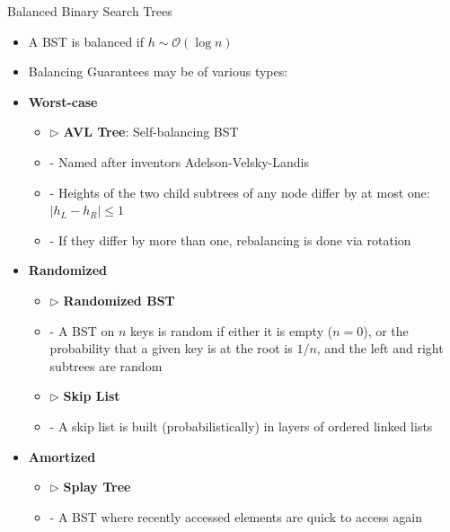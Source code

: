\documentclass[aspectratio=169, xcolor=dvipsnames]{beamer}
\begin{document}
\begin{frame}{Balanced Binary Search Trees}
    \begin{itemize}[<+->]
        \item A BST is balanced if $h \sim \mathcal{O}(\log n)$
        \item Balancing Guarantees may be of various types:
        \item \textbf{Worst-case}
        \begin{itemize}[<+->]
            \item $\triangleright$ \textbf{AVL Tree}: Self-balancing BST
            \item - Named after inventors Adelson-Velsky-Landis
            \item - Heights of the two child subtrees of any node differ by at most one: $| h_L - h_R | \le 1$
            \item - If they differ by more than one, rebalancing is done via rotation
        \end{itemize}
        \item \textbf{Randomized}
        \begin{itemize}[<+->]
            \item $\triangleright$ \textbf{Randomized BST}
            \item - A BST on $n$ keys is random if either it is empty ($n = 0$), or the probability that a given key is at the root is $1/n$, and the left and right subtrees are random
            \item $\triangleright$ \textbf{Skip List}
            \item - A skip list is built (probabilistically) in layers of ordered linked lists
        \end{itemize}
        \item \textbf{Amortized}
        \begin{itemize}[<+->]
            \item $\triangleright$ \textbf{Splay Tree}
            \item - A BST where recently accessed elements are quick to access again
        \end{itemize}
    \end{itemize}
\end{frame}
\end{document}
